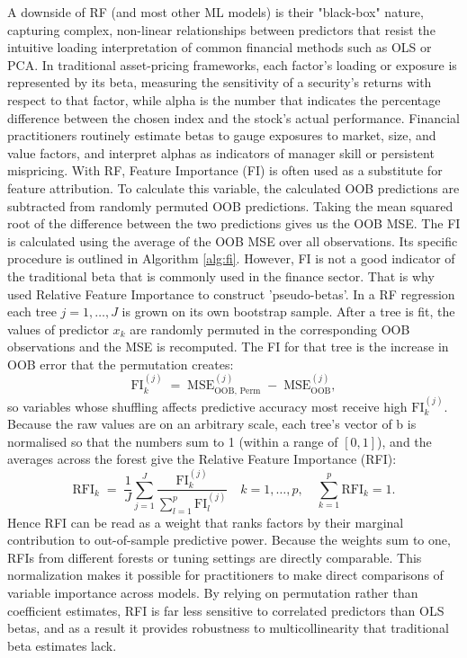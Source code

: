 A downside of RF (and most other ML models) is their "black-box" nature, capturing complex, non-linear relationships between predictors that resist the intuitive loading interpretation of common financial methods such as OLS or PCA. In traditional asset-pricing frameworks, each factor's loading or exposure is represented by its beta, measuring the sensitivity of a security's returns with respect to that factor, while alpha is the number that indicates the percentage difference between the chosen index and the stock's actual performance. Financial practitioners routinely estimate betas to gauge exposures to market, size, and value factors, and interpret alphas as indicators of manager skill or persistent mispricing. With RF, Feature Importance (FI) is often used as a substitute for feature attribution. To calculate this variable, the calculated OOB predictions are subtracted from randomly permuted OOB predictions. Taking the mean squared root of the difference between the two predictions gives us the OOB MSE. The FI is calculated using the average of the OOB MSE over all observations. Its specific procedure is outlined in Algorithm \ref{alg:fi}. However, FI is not a good indicator of the traditional beta that is commonly used in the finance sector. That is why  used Relative Feature Importance to construct 'pseudo-betas'. In a RF regression each tree \(j=1,\dots,J\) is grown on its own bootstrap sample. After a tree is fit, the values of predictor \(x_k\) are randomly permuted in the corresponding OOB observations and the MSE is recomputed. The FI for that tree is the increase in OOB error that the permutation creates:
\begin{equation}
\mathrm{FI}^{(j)}_{k}
\;=\;
\mathrm{MSE}^{(j)}_{\mathrm{OOB,\,Perm}}
\;-\;
\mathrm{MSE}^{(j)}_{\mathrm{OOB}},
\end{equation}
so variables whose shuffling affects predictive accuracy most receive high \(\mathrm{FI}^{(j)}_{k}\). Because the raw values are on an arbitrary scale, each tree's vector of   b is normalised so that the numbers sum to 1 (within a range of $[0,1]$), and the averages across the forest give the Relative Feature Importance (RFI):
\begin{equation}
\mathrm{RFI}_{k}
\;=\;
\frac{1}{J}
\sum_{j=1}^{J}
\frac{\mathrm{FI}^{(j)}_{k}}
     {\sum_{l=1}^{p}\mathrm{FI}^{(j)}_{l}}
\quad k=1,\dots,p,
\quad
\sum_{k=1}^{p}\mathrm{RFI}_{k}=1.
\end{equation}
Hence RFI can be read as a weight that ranks factors by their marginal contribution to out-of-sample predictive power. Because the weights sum to one, RFIs from different forests or tuning settings are directly comparable. This normalization makes it possible for practitioners to make direct comparisons of variable importance across models. By relying on permutation rather than coefficient estimates, RFI is far less sensitive to correlated predictors than OLS betas, and as a result it provides robustness to multicollinearity that traditional beta estimates lack. 

